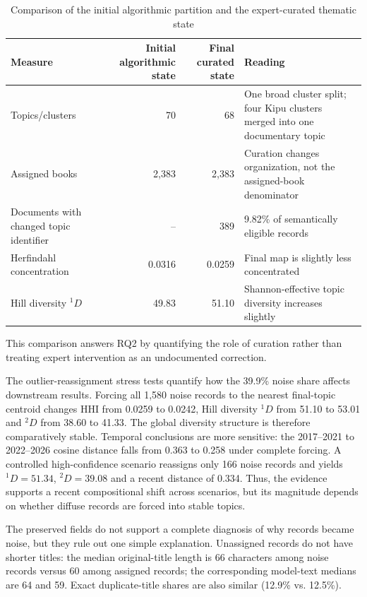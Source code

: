 \documentclass[futureinternet,article,submit,moreauthors]{Definitions/mdpi}
\begin{document}
\begin{table}[htbp]
\caption{Comparison of the initial algorithmic partition and the expert-curated thematic state}\label{tab:auto_curated}
\small
\begin{tabularx}{\textwidth}{@{}p{}rrY@{}}
\toprule
Measure & Initial algorithmic state & Final curated state & Reading \\
\midrule
Topics/clusters & 70 & 68 & One broad cluster split; four Kipu clusters merged into one documentary topic \\
Assigned books & 2,383 & 2,383 & Curation changes organization, not the assigned-book denominator \\
Documents with changed topic identifier & -- & 389 & 9.82\% of semantically eligible records \\
Herfindahl concentration & 0.0316 & 0.0259 & Final map is slightly less concentrated \\
Hill diversity ${}^{1}D$ & 49.83 & 51.10 & Shannon-effective topic diversity increases slightly \\
\bottomrule
\end{tabularx}
\end{table}

This comparison answers RQ2 by quantifying the role of curation rather than treating expert intervention as an undocumented correction.

The outlier-reassignment stress tests quantify how the 39.9\% noise share affects downstream results. Forcing all 1,580 noise records to the nearest final-topic centroid changes HHI from 0.0259 to 0.0242, Hill diversity ${}^{1}D$ from 51.10 to 53.01 and ${}^{2}D$ from 38.60 to 41.33. The global diversity structure is therefore comparatively stable. Temporal conclusions are more sensitive: the 2017--2021 to 2022--2026 cosine distance falls from 0.363 to 0.258 under complete forcing. A controlled high-confidence scenario reassigns only 166 noise records and yields ${}^{1}D=51.34$, ${}^{2}D=39.08$ and a recent distance of 0.334. Thus, the evidence supports a recent compositional shift across scenarios, but its magnitude depends on whether diffuse records are forced into stable topics.

The preserved fields do not support a complete diagnosis of why records became noise, but they rule out one simple explanation. Unassigned records do not have shorter titles: the median original-title length is 66 characters among noise records versus 60 among assigned records; the corresponding model-text medians are 64 and 59. Exact duplicate-title shares are also similar (12.9\% vs. 12.5\%).
\end{document}
